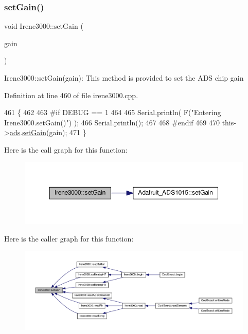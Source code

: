 \subsubsection{\texorpdfstring{set\+Gain()}{setGain()}}
{\footnotesize\ttfamily void Irene3000\+::set\+Gain (\begin{DoxyParamCaption}\item[{\hyperlink{_cool_adafruit___a_d_s1015_8h_a3d6c0e15829a207b9155890811fa4781}{ads\+Gain\+\_\+t}}]{gain }\end{DoxyParamCaption})}

Irene3000\+::set\+Gain(gain)\+: This method is provided to set the A\+DS chip gain 

Definition at line 460 of file irene3000.\+cpp.


\begin{DoxyCode}
461 \{
462 
463 \textcolor{preprocessor}{#if DEBUG == 1  }
464 
465     Serial.println( F(\textcolor{stringliteral}{"Entering Irene3000.setGain()"}) );
466     Serial.println();
467 
468 \textcolor{preprocessor}{#endif}
469 
470     this->\hyperlink{class_irene3000_a1215e77ba761c9908d80d691f149e135}{ads}.\hyperlink{class_adafruit___a_d_s1015_a399441eace686975ff22937cbe45cc50}{setGain}(gain);
471 \}
\end{DoxyCode}
Here is the call graph for this function\+:\nopagebreak
\begin{figure}[H]
\begin{center}
\leavevmode
\includegraphics[width=350pt]{d6/d03/class_irene3000_aff7c5da186b388e7272e63ff88a20c34_cgraph}
\end{center}
\end{figure}
Here is the caller graph for this function\+:\nopagebreak
\begin{figure}[H]
\begin{center}
\leavevmode
\includegraphics[width=350pt]{d6/d03/class_irene3000_aff7c5da186b388e7272e63ff88a20c34_icgraph}
\end{center}
\end{figure}


